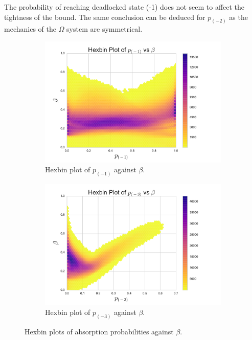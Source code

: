 \documentclass{article}
\numberwithin{equation}{section}
\begin{document}
The probability of reaching deadlocked state (-1) does not seem to affect the
tightness of the bound.
The same conclusion can be deduced for $p_{(-2)}$ as the mechanics of the
$\Omega$ system are symmetrical.

\begin{figure}[!htbp]
\begin{subfigure}[b]{0.5\textwidth}
  \includegraphics[width=\textwidth]{images/hexbin-1}
  \caption{Hexbin plot of $p_{(-1)}$ against $\beta$.}
  \label{fig:hexbin_p1}
\end{subfigure}
\begin{subfigure}[b]{0.5\textwidth}
  \includegraphics[width=\textwidth]{images/hexbin-3}
  \caption{Hexbin plot of $p_{(-3)}$ against $\beta$.}
  \label{fig:hexbin_p3}
\end{subfigure}
\caption{Hexbin plots of absorption probabilities against $\beta$.}
\label{fig:hexbinplot_ratio_analysis}
\end{figure}
\end{document}

